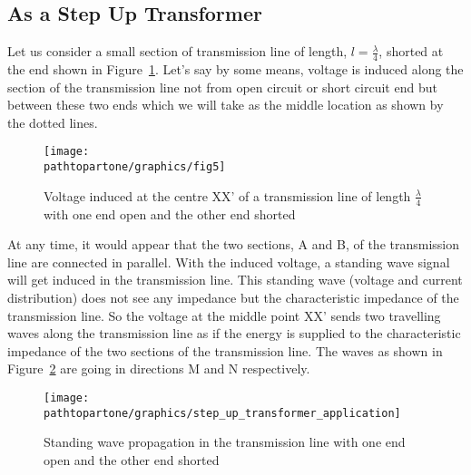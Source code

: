 \subsection{As a Step Up Transformer}
Let us consider a small section of transmission line of length, $l = \frac{\lambda}{4}$, shorted at the end shown in Figure~\ref{fig:fig5}. Let's say by some means, voltage is induced along the section of the transmission line not from open circuit or short circuit end but between these two ends which we will take as the middle location as shown by the dotted lines.
\begin{figure}[h]
\centering
\texttt{[image: \\pathtopartone/graphics/fig5]}
\caption{Voltage induced at the centre XX' of a transmission line of length $\frac{\lambda}{4}$ with one end open and the other end shorted}
\label{fig:fig5}
\end{figure}

At any time, it would appear that the two sections, A and B, of the transmission line are connected in parallel. With the induced voltage, a standing wave signal will get induced in the transmission line. This standing wave (voltage and current distribution) does not see any impedance but the characteristic impedance of the transmission line. So the voltage at the middle point XX' sends two travelling waves along the transmission line as if the energy is supplied to the characteristic impedance of the two sections of the transmission line. The waves as shown in Figure~\ref{fig:fig6} are going in directions M and N respectively.
\begin{figure}[h]
\centering
\texttt{[image: \\pathtopartone/graphics/step\_up\_transformer\_application]}
\caption{Standing wave propagation in the transmission line with one end open and the other end shorted}
\label{fig:fig6}
\end{figure}

